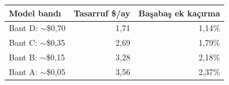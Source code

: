 \begin{tabular}{@{}lrr@{}}
\toprule
\textbf{Model bandı} & \textbf{Tasarruf \$/ay} & \textbf{Başabaş ek kaçırma} \\
\midrule
Bant D: $\sim$\$0,70 & 1,71 & 1,14\% \\
Bant C: $\sim$\$0,35 & 2,69 & 1,79\% \\
Bant B: $\sim$\$0,15 & 3,28 & 2,18\% \\
Bant A: $\sim$\$0,05 & 3,56 & 2,37\% \\
\bottomrule
\end{tabular}
